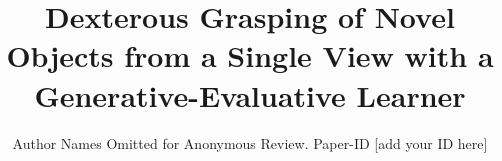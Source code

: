 \documentclass[conference]{IEEEtran}
\begin{document}
\title{Dexterous Grasping of Novel Objects from a Single View with a Generative-Evaluative Learner}

\author{Author Names Omitted for Anonymous Review. Paper-ID [add your ID here]}





% 


\maketitle
\end{document}
